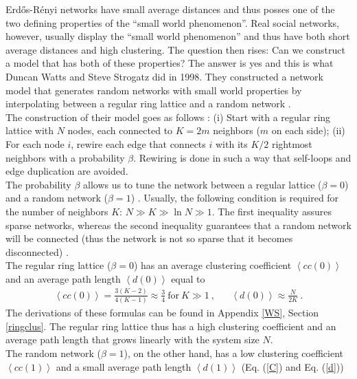 \documentclass[11 pt , letterpaper , twoside , openright]{book}
\begin{document}
Erd\H{o}s-R\'{e}nyi networks have small average distances and thus posses one of the two defining properties of the ``small world phenomenon''. Real social networks, however, usually display the ``small world phenomenon'' and thus have both short average distances and high clustering. The question then rises: Can we construct a model that has both of these properties? The answer is yes and this is what Duncan Watts and Steve Strogatz did in 1998. They constructed a network model that generates random networks with small world properties by interpolating between a regular ring lattice and a random network \cite{Watts1998}.\\
\newline
The construction of their model goes as follows \cite{Watts1998}: (i) Start with a regular ring lattice with $N$ nodes, each connected to $K = 2m$ neighbors ($m$ on each side); (ii) For each node $i$, rewire each edge that connects $i$ with its $K/2$ rightmost neighbors with a probability $\beta$. Rewiring is done in such a way that self-loops and edge duplication are avoided.\\
\newline
The probability $\beta$ allows us to tune the network between a regular lattice ($\beta = 0$) and a random network ($\beta = 1$) \cite{Watts1998}. Usually, the following condition is required for the number of neighbors $K$: $N \gg K \gg \ln{N} \gg 1$. The first inequality assures sparse networks, whereas the second inequality guarantees that a random network will be connected (thus the network is not so sparse that it becomes disconnected) \cite{Watts1998}.\\
\newline
The regular ring lattice ($\beta=0$) has an average clustering coefficient $\left<cc(0)\right>$ and an average path length $\left<d(0)\right>$ equal to \cite{Watts1998}
\begin{align}\label{C0}
	\left<cc(0)\right> = \frac{3(K-2)}{4(K-1)} \approx \frac{3}{4} \ \text{for}\ K \gg 1 \ , && \left<d(0)\right> \approx \frac{N}{2K} \ .
\end{align}
The derivations of these formulas can be found in Appendix \ref{WS}, Section \ref{ringclus}. The regular ring lattice thus has a high clustering coefficient and an average path length that grows linearly with the system size $N$. \\
\newline
The random network ($\beta = 1$), on the other hand, has a low clustering coefficient $\left<cc(1)\right>$ and a small average path length $\left<d(1)\right>$ (Eq. (\ref{C}) and Eq. (\ref{d})) \cite{Watts1998}
\end{document}
